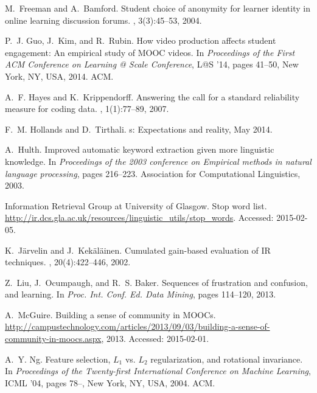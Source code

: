 \documentclass{edm_template}
\begin{document}
\begin{thebibliography}{10}
M.~Freeman and A.~Bamford.
\newblock Student choice of anonymity for learner identity in online learning
  discussion forums.
, 3(3):45--53, 2004.

P.~J. Guo, J.~Kim, and R.~Rubin.
\newblock How video production affects student engagement: An empirical study
  of {MOOC} videos.
\newblock In {\em Proceedings of the First ACM Conference on Learning @ Scale
  Conference}, L@S '14, pages 41--50, New York, NY, USA, 2014. ACM.

A.~F. Hayes and K.~Krippendorff.
\newblock Answering the call for a standard reliability measure for coding
  data.
, 1(1):77--89, 2007.

F.~M. Hollands and D.~Tirthali.
s: Expectations and reality, May 2014.

A.~Hulth.
\newblock Improved automatic keyword extraction given more linguistic
  knowledge.
\newblock In {\em Proceedings of the 2003 conference on Empirical methods in
  natural language processing}, pages 216--223. Association for Computational
  Linguistics, 2003.

{Information Retrieval Group at University of Glasgow}.
\newblock Stop word list.
\newblock \url{http://ir.dcs.gla.ac.uk/resources/linguistic_utils/stop_words}.
\newblock Accessed: 2015-02-05.

K.~J{\"a}rvelin and J.~Kek{\"a}l{\"a}inen.
\newblock Cumulated gain-based evaluation of {IR} techniques.
, 20(4):422--446,
  2002.

Z.~Liu, J.~Ocumpaugh, and R.~S. Baker.
\newblock Sequences of frustration and confusion, and learning.
\newblock In {\em Proc. Int. Conf. Ed. Data Mining}, pages 114--120, 2013.

A.~McGuire.
\newblock Building a sense of community in {MOOC}s.
\newblock
  \url{http://campustechnology.com/articles/2013/09/03/building-a-sense-of-community-in-moocs.aspx},
  2013.
\newblock Accessed: 2015-02-01.

A.~Y. Ng.
\newblock Feature selection, {$L_{1}$} vs. {$L_{2}$} regularization, and
  rotational invariance.
\newblock In {\em Proceedings of the Twenty-first International Conference on
  Machine Learning}, ICML '04, pages 78--, New York, NY, USA, 2004. ACM.


\end{thebibliography}
\end{document}

